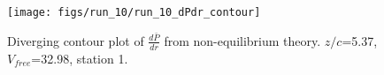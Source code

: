 \begin{figure}[H]
\centering
\texttt{[image: figs/run\_10/run\_10\_dPdr\_contour]}
\caption{Diverging contour plot of $\frac{d\bar{P}}{dr}$ from non-equilibrium theory. $z/c$=5.37, $V_{free}$=32.98, station 1.}
\label{fig:run_10_dPdr_contour}
\end{figure}


